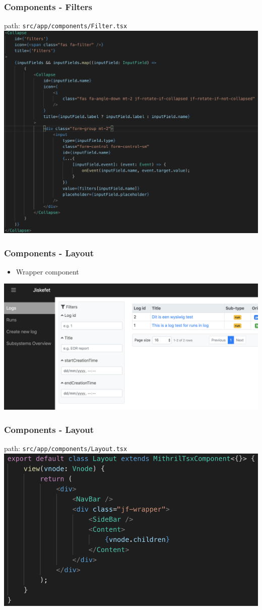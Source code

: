 \documentclass[12pt]{beamer}
\begin{document}
	\begin{frame}
		\frametitle{Components - Filters}
		path: \texttt{src/app/components/Filter.tsx}
		\includegraphics[scale=.3]{../assets/filter-component.png}
	\end{frame}

	\begin{frame}
		\frametitle{Components - Layout}
		\begin{itemize}
			\item Wrapper component
		\end{itemize}
		\includegraphics[scale=.25]{../assets/layout-element.png}
	\end{frame}

	\begin{frame}
		\frametitle{Components - Layout}
		path: \texttt{src/app/components/Layout.tsx}
		\includegraphics[scale=.5]{../assets/layout-component.png}
	\end{frame}
\end{document}

